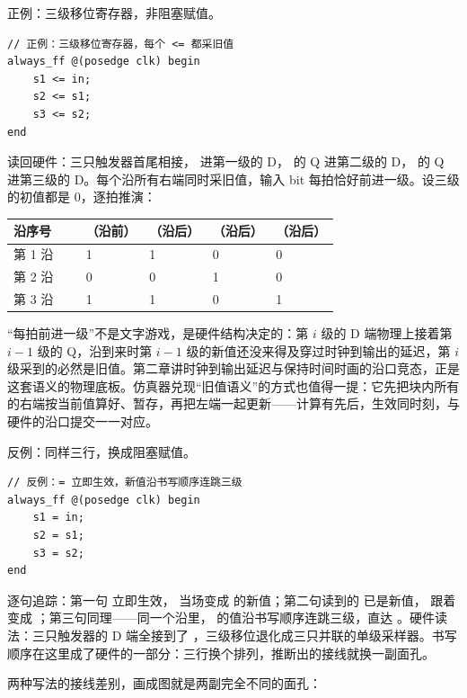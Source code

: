正例：三级移位寄存器，非阻塞赋值。

\begin{lstlisting}
// 正例：三级移位寄存器，每个 <= 都采旧值
always_ff @(posedge clk) begin
    s1 <= in;
    s2 <= s1;
    s3 <= s2;
end
\end{lstlisting}

读回硬件：三只触发器首尾相接， 进第一级的 D， 的 Q 进第二级的 D， 的 Q 进第三级的 D。每个沿所有右端同时采旧值，输入 bit 每拍恰好前进一级。设三级的初值都是 0，逐拍推演：

\begin{longtable}{L{0.16\linewidth}L{0.14\linewidth}L{0.14\linewidth}L{0.14\linewidth}L{0.14\linewidth}}
\toprule
沿序号 & （沿前） & （沿后） & （沿后） & （沿后） \\
\midrule
第 1 沿 & 1 & 1 & 0 & 0 \\
第 2 沿 & 0 & 0 & 1 & 0 \\
第 3 沿 & 1 & 1 & 0 & 1 \\
\bottomrule
\end{longtable}

“每拍前进一级”不是文字游戏，是硬件结构决定的：第 $i$ 级的 D 端物理上接着第 $i-1$ 级的 Q，沿到来时第 $i-1$ 级的新值还没来得及穿过时钟到输出的延迟，第 $i$ 级采到的必然是旧值。第二章讲时钟到输出延迟与保持时间时画的沿口竞态，正是这套语义的物理底板。仿真器兑现“旧值语义”的方式也值得一提：它先把块内所有 \code{<=} 的右端按当前值算好、暂存，再把左端一起更新——计算有先后，生效同时刻，与硬件的沿口提交一一对应。

反例：同样三行，换成阻塞赋值。

\begin{lstlisting}
// 反例：= 立即生效，新值沿书写顺序连跳三级
always_ff @(posedge clk) begin
    s1 = in;
    s2 = s1;
    s3 = s2;
end
\end{lstlisting}

逐句追踪：第一句  立即生效， 当场变成  的新值；第二句读到的  已是新值， 跟着变成 ；第三句同理——同一个沿里， 的值沿书写顺序连跳三级，直达 。硬件读法：三只触发器的 D 端全接到了 ，三级移位退化成三只并联的单级采样器。书写顺序在这里成了硬件的一部分：三行换个排列，推断出的接线就换一副面孔。

两种写法的接线差别，画成图就是两副完全不同的面孔：

